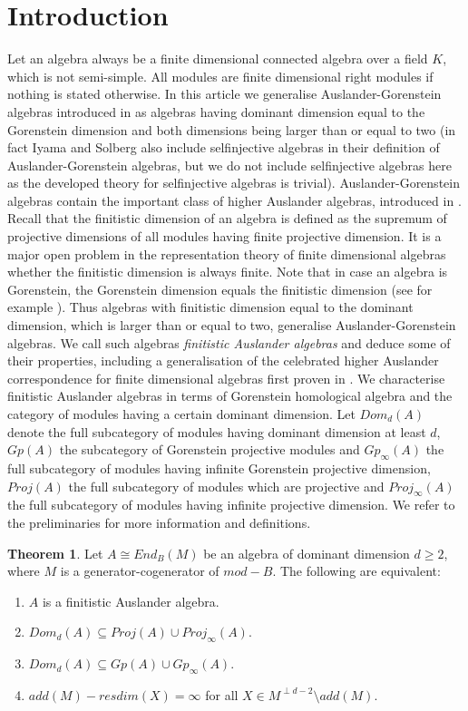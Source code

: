 \documentclass[a4paper]{amsart}
\theoremstyle{definition}
\newtheorem*{theorem*}{Theorem}
\theoremstyle{remark}
\numberwithin{equation}{theorem}
\begin{document}
\section*{Introduction}
Let an algebra always be a finite dimensional connected algebra over a field $K$, which is not semi-simple. All modules are finite dimensional right modules if nothing is stated otherwise.
In this article we generalise Auslander-Gorenstein algebras introduced in \cite{IyaSol} as algebras having dominant dimension equal to the Gorenstein dimension and both dimensions being larger than or equal to two (in fact Iyama and Solberg also include selfinjective algebras in their definition of Auslander-Gorenstein algebras, but we do not include selfinjective algebras here as the developed theory for selfinjective algebras is trivial). Auslander-Gorenstein algebras contain the important class of higher Auslander algebras, introduced in \cite{Iya}. Recall that the finitistic dimension of an algebra is defined as the supremum of projective dimensions of all modules having finite projective dimension. It is a major open problem in the representation theory of finite dimensional algebras whether the finitistic dimension is always finite.
Note that in case an algebra is Gorenstein, the Gorenstein dimension equals the finitistic dimension (see for example \cite{Che}). Thus algebras with finitistic dimension equal to the dominant dimension, which is larger than or equal to two, generalise Auslander-Gorenstein algebras. We call such algebras \emph{finitistic Auslander algebras} and deduce some of their properties, including a generalisation of the celebrated higher Auslander correspondence for finite dimensional algebras first proven in \cite{Iya}. We characterise finitistic Auslander algebras in terms of Gorenstein homological algebra and the category of modules having a certain dominant dimension. Let $Dom_d(A)$ denote the full subcategory of modules having dominant dimension at least $d$, $Gp(A)$ the subcategory of Gorenstein projective modules and $Gp_{\infty}(A)$ the full subcategory of modules having infinite Gorenstein projective dimension, $Proj(A)$ the full subcategory of modules which are projective and $Proj_{\infty}(A)$ the full subcategory of modules having infinite projective dimension. We refer to the preliminaries for more information and definitions.
\begin{theorem*} 
Let $A \cong End_B(M)$ be an algebra of dominant dimension $d \geq 2$, where $M$ is a generator-cogenerator of $mod-B$.
The following are equivalent:
\begin{enumerate}
\item $A$ is a finitistic Auslander algebra.
\item $Dom_d(A) \subseteq Proj(A) \cup Proj_{\infty}(A)$.
\item $Dom_d(A) \subseteq Gp(A) \cup Gp_{\infty}(A)$.
\item $add(M)-resdim(X)= \infty$ for all $X \in M^{\perp d-2} \setminus add(M)$.
\end{enumerate}
\end{theorem*}
\end{document}
